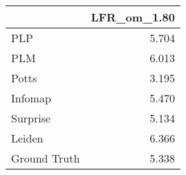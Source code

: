 \begin{tabular}{lr}
\toprule
{} & LFR_om_1.80 \\
\midrule
PLP          &       5.704 \\
PLM          &       6.013 \\
Potts        &       3.195 \\
Infomap      &       5.470 \\
Surprise     &       5.134 \\
Leiden       &       6.366 \\
Ground Truth &       5.338 \\
\bottomrule
\end{tabular}
